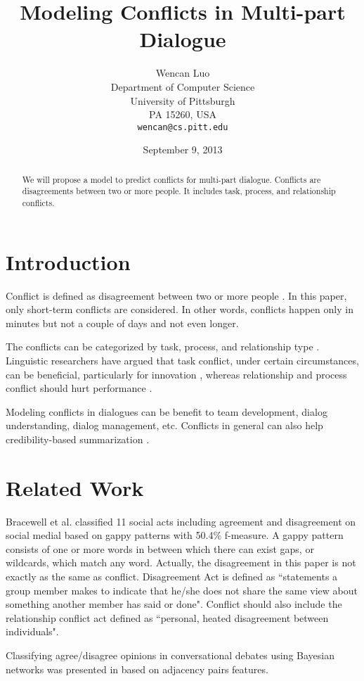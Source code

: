 \documentclass[11pt,letterpaper]{article}
\title{Modeling Conflicts in Multi-part Dialogue}
\author{Wencan Luo\\
	    Department of Computer Science\\
	    University of Pittsburgh\\
	    PA 15260, USA\\
	    {\tt wencan@cs.pitt.edu}
	  }
\date{September 9, 2013}
\begin{document}
\maketitle
\begin{abstract}
We will propose a model to predict conflicts for multi-part dialogue. Conflicts are disagreements between two or more people. It includes task, process, and relationship conflicts.

\end{abstract}

\section{Introduction}
Conflict is defined as disagreement between two or more people \cite{Paletz:2011}. In this paper, only short-term conflicts are considered. In other words, conflicts happen only in minutes but not a couple of days and not even longer.

The conflicts can be categorized by task, process, and relationship type \cite{Jehn:1995,Jehn:1997}. Linguistic researchers have argued that task conflict, under certain circumstances, can be beneficial, particularly for innovation \cite{Jehn:1997,West:2002}, whereas relationship and process conflict should hurt performance \cite{Jehn:1997}.

Modeling conflicts in dialogues can be benefit to team development, dialog understanding, dialog management, etc. Conflicts in general can also help credibility-based summarization \cite{Kaneko:2009}.

\section{Related Work}
Bracewell et al.  classified 11 social acts including agreement and disagreement on social medial based on gappy patterns with 50.4\% f-measure. A gappy pattern consists of one or more words in between which there can exist gaps, or wildcards, which match any word. Actually, the disagreement in this paper is not exactly as the same as conflict. Disagreement Act is defined as ``statements a group member makes to indicate that he/she does not share the same
view about something another member has said or done". Conflict should also include the relationship conflict act defined as ``personal, heated disagreement between individuals".

Classifying agree/disagree opinions in conversational debates using Bayesian networks was presented in \cite{Galley:2004} based on adjacency pairs features.
\end{document}
